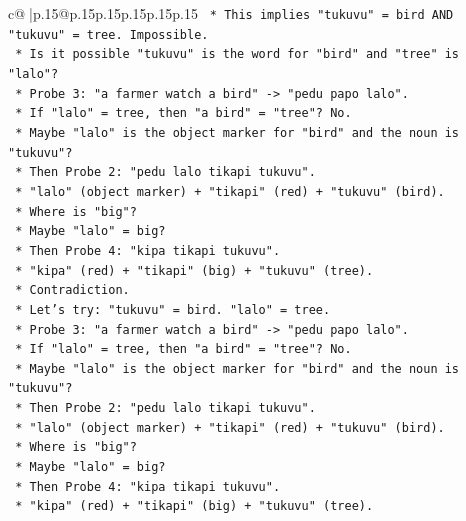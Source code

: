 \documentclass{article}
\begin{document}
{\begin{supertabular}{c@{$\;$}|p{.15\linewidth}@{}p{.15\linewidth}p{.15\linewidth}p{.15\linewidth}p{.15\linewidth}p{.15\linewidth}}
{{{\texttt{                    *   This implies "tukuvu" = bird AND "tukuvu" = tree. Impossible.} \\
\texttt{                *   Is it possible "tukuvu" is the word for "bird" and "tree" is "lalo"?} \\
\texttt{                *   Probe 3: "a farmer watch a bird" {-}> "pedu papo lalo".} \\
\texttt{                    *   If "lalo" = tree, then "a bird" = "tree"? No.} \\
\texttt{                *   Maybe "lalo" is the object marker for "bird" and the noun is "tukuvu"?} \\
\texttt{                *   Then Probe 2: "pedu lalo tikapi tukuvu".} \\
\texttt{                    *   "lalo" (object marker) + "tikapi" (red) + "tukuvu" (bird).} \\
\texttt{                    *   Where is "big"?} \\
\texttt{                    *   Maybe "lalo" = big?} \\
\texttt{                    *   Then Probe 4: "kipa tikapi tukuvu".} \\
\texttt{                    *   "kipa" (red) + "tikapi" (big) + "tukuvu" (tree).} \\
\texttt{                    *   Contradiction.} \\
\texttt{                *   Let's try: "tukuvu" = bird. "lalo" = tree.} \\
\texttt{                *   Probe 3: "a farmer watch a bird" {-}> "pedu papo lalo".} \\
\texttt{                    *   If "lalo" = tree, then "a bird" = "tree"? No.} \\
\texttt{                *   Maybe "lalo" is the object marker for "bird" and the noun is "tukuvu"?} \\
\texttt{                *   Then Probe 2: "pedu lalo tikapi tukuvu".} \\
\texttt{                    *   "lalo" (object marker) + "tikapi" (red) + "tukuvu" (bird).} \\
\texttt{                    *   Where is "big"?} \\
\texttt{                    *   Maybe "lalo" = big?} \\
\texttt{                    *   Then Probe 4: "kipa tikapi tukuvu".} \\
\texttt{                    *   "kipa" (red) + "tikapi" (big) + "tukuvu" (tree).} \\
}}}
\end{supertabular}}
\end{document}
